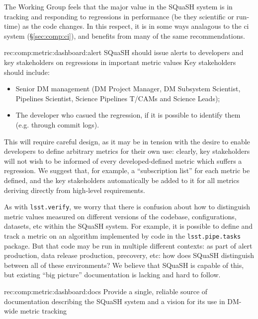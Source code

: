 The Working Group feels that the major value in the SQuaSH system is in tracking and responding to regressions in performance (be they scientific or run-time) as the code changes.
In this respect, it is in some ways analagous to the \gls{ci} system (\S\ref{sec:comp:ci}), and benefits from many of the same recommendations.

\begin{recommendation}
    {rec:comp:metric:dashboard:alert}
    {SQuaSH should issue alerts to developers and key stakeholders on regressions in important metric values}
    Key stakeholders should include:
    \begin{itemize}
      \item{Senior DM management (DM Project Manager, DM Subsystem Scientist, Pipelines Scientist, Science Pipelines T/CAMs and Science Leads);}
      \item{The developer who casued the regression, if it is possible to identify them (e.g. through commit logs).}
    \end{itemize}
    This will require careful design, as it may be in tension with the desire to enable developers to define arbitrary metrics for their own use: clearly, key stakeholders will not wish to be informed of every developed-defined metric which suffers a regression.
    We suggest that, for example, a ``subscription list'' for each metric be defined, and the key stakeholders automatically be added to it for all metrics deriving directly from high-level requirements.
\end{recommendation}

As with \texttt{lsst.verify}, we worry that there is confusion about how to distinguish metric values measured on different versions of the codebase, configurations, datasets, etc within the SQuaSH system.
For example, it is possible to define and track a metric on an algorithm implemented by code in the \texttt{lsst.pipe.tasks} package.
But that code may be run in multiple different contexts: as part of alert production, data release production, precovery, etc: how does SQuaSH distinguish between all of these environments?
We believe that SQuaSH is capable of this, but existing ``big picture'' documentation is lacking and hard to follow.

\begin{recommendation}
  {rec:comp:metric:dashboard:docs}
  {Provide a single, reliable source of documentation describing the SQuaSH system and a vision for its use in DM-wide metric tracking}
\end{recommendation}

